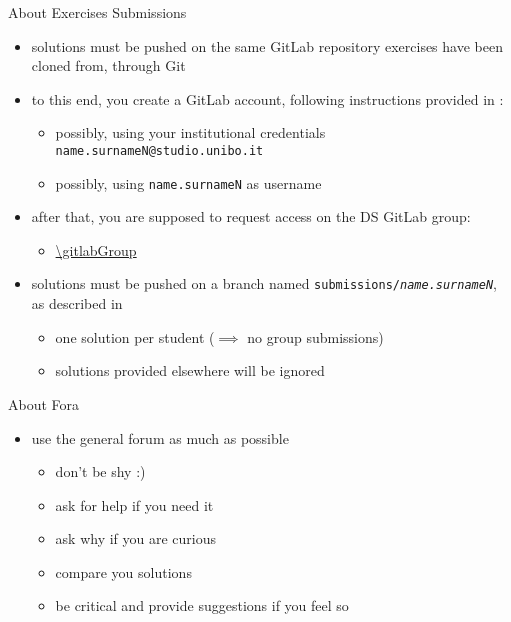 \documentclass[presentation]{beamer}\mode<presentation>{\usetheme{AMSBolognaFC}}
\begin{document}
\begin{frame}[c]{About Exercises Submissions}

    \begin{itemize}
        \item solutions must be pushed on the same GitLab repository exercises have been cloned from, \alert{through Git}

        \vfill

        \item to this end, you create a GitLab account, following instructions provided in \cite{envSetup}:
        \begin{itemize}
            \item possibly, using your institutional credentials \texttt{\alert{name.surnameN}@studio.unibo.it}
            \item possibly, using \texttt{\alert{name.surnameN}} as username
        \end{itemize}

        \vfill

        \item after that, you are supposed to request access on the DS \academicYearShort{} GitLab group:
        \begin{itemize}
            \item \url{\gitlabGroup}
        \end{itemize}

        \vfill

        \item solutions must be pushed on a branch named \alert{\texttt{submissions/\textit{name.surnameN}}}, as described in \cite{envSetup}
        \begin{itemize}
            \item one solution per student ($\implies$ no group submissions)
            \item solutions provided elsewhere will be ignored
        \end{itemize}
    \end{itemize}
\end{frame}

\begin{frame}[c]{About Fora}
    \begin{itemize}
        \item use the general forum as much as possible
        \\
        \uurl{\generalForum}
        \begin{itemize}
            \item don't be shy :)
            \item ask for help if you need it
            \item ask why if you are curious
            \item compare you solutions
            \item be critical and provide suggestions if you feel so
        \end{itemize}
    \end{itemize}
\end{frame}
\end{document}
